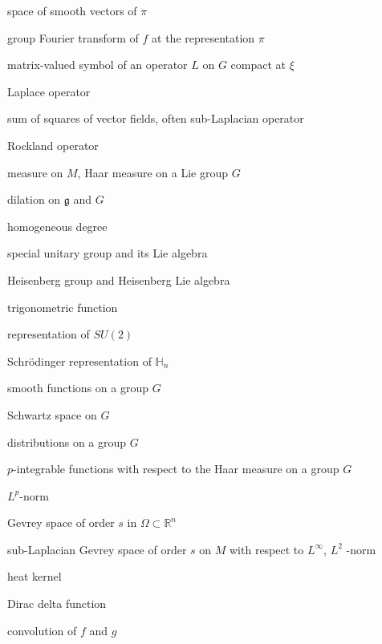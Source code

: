 \documentclass[12pt,oneside,a4paper]{book}
\numberwithin{equation}{section}     %
\theoremstyle{plain}
\theoremstyle{definition}
\newcommand{\R}{{\mathbb R}}
\newcommand{\h}{{\mathbb H}}
\newcommand{\Rn}{{\R}^n}
\newcommand{\slp}{{\mathcal L}}
\begin{document}
\begin{abbrv}
	\item[$\mathcal{H}_\pi^\infty$]			space of smooth vectors of $\pi$
	\item[$\mathcal{F}_G(f)(\pi),\widehat{f}(\pi),\pi(f)$] 				group Fourier transform of $f$ at the representation $\pi$
	\item[$\sigma_L(\xi)=\widehat{L}(\xi)$]				matrix-valued symbol of an operator $L$ on $G$ compact at $\xi$	
	\item[$\Delta$] 					Laplace operator
	\item[$\slp$]   					sum of squares of vector fields, often sub-Laplacian operator
	\item[$\mathcal{R}$]				Rockland operator
	\item[$\mu$]					measure on $M$, Haar measure on a Lie group $G$
	\item[$D_r$] 					dilation on $\mathfrak{g}$ and $G$
	\item[{$[\alpha]$}]				homogeneous degree
	\item[$SU(2)$, $\mathfrak{su}(2)$] 					special unitary group and its Lie algebra
	\item[$\mathbb{H}_n$, $\mathfrak{h}_n$]                Heisenberg group and Heisenberg Lie algebra
	\item[$e_\xi$] 			trigonometric function
	\item[$T_l$] 			representation of $SU(2)$
	\item[$\pi_{\lambda}$]	Schr\"odinger representation of $\h_n$
	\item[$\mathcal{D}(G)$, $\mathcal{C}^\infty(G)$]     smooth functions on a group $G$
	\item[$\mathcal{S}(G)$]  			Schwartz space on $G$
	\item[$\mathcal{D}'(G)$]			distributions on a group $G$
	\item[$L^p(G))$]	    			$p$-integrable functions with respect to the Haar measure on a group $G$			
	\item[$\smash{\displaystyle{\|\cdot\|_{L^p}}}$] 				$L^p$-norm
	\item[$G^s(\Omega)$] 						Gevrey space of order $s$ in $\Omega\subset\Rn$
	\item[$\gamma^s_{\mathbf{X},L^\infty}(M)$, $\gamma^s_{\mathbf{X},L^2}(M)$]  sub-Laplacian Gevrey space of order $s$ on $M$ with respect to $L^\infty$, $L^2$ -norm
	\item[$h_t$]						heat kernel
	\item[$\delta_0$]				Dirac delta function
	\item[$f\star g$]			convolution of $f$ and $g$
\end{abbrv}
\end{document}
